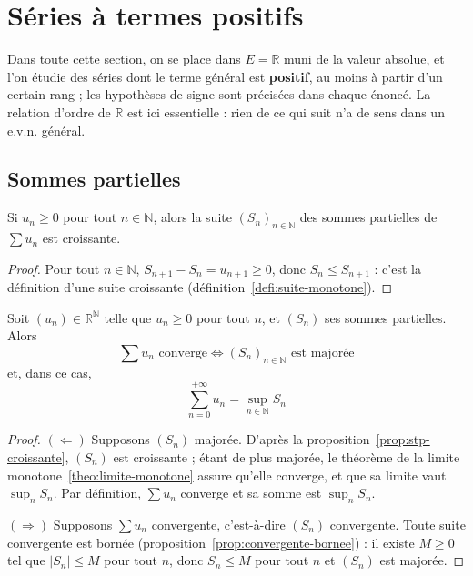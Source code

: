 \section{Séries à termes positifs}
\label{sec:stp}

Dans toute cette section, on se place dans $E=\mathbb{R}$ muni de la valeur absolue, et l'on étudie des séries dont le terme général est \textbf{positif}, au moins à partir d'un certain rang ; les hypothèses de signe sont précisées dans chaque énoncé. La relation d'ordre de $\mathbb{R}$ est ici essentielle : rien de ce qui suit n'a de sens dans un e.v.n. général.

\subsection{Sommes partielles}

\begin{prop}
\label{prop:stp-croissante}
Si $u_n\geq 0$ pour tout $n\in\mathbb{N}$, alors la suite $(S_n)_{n\in\mathbb{N}}$ des sommes partielles de $\sum u_n$ est croissante.
\end{prop}

\begin{proof}
Pour tout $n\in\mathbb{N}$, $S_{n+1}-S_n = u_{n+1} \geq 0$, donc $S_n\leq S_{n+1}$ : c'est la définition d'une suite croissante (définition~\ref{defi:suite-monotone}).
\end{proof}

\begin{theo}
\label{theo:stp-majoree}
Soit $(u_n)\in\mathbb{R}^{\mathbb{N}}$ telle que $u_n\geq 0$ pour tout $n$, et $(S_n)$ ses sommes partielles. Alors
\[\sum u_n \text{ converge} \iff (S_n)_{n\in\mathbb{N}} \text{ est majorée}\]
et, dans ce cas,
\[\sum_{n=0}^{+\infty}u_n = \sup_{n\in\mathbb{N}} S_n\]
\end{theo}

\begin{proof}
$(\Leftarrow)$ Supposons $(S_n)$ majorée. D'après la proposition~\ref{prop:stp-croissante}, $(S_n)$ est croissante ; étant de plus majorée, le théorème de la limite monotone~\ref{theo:limite-monotone} assure qu'elle converge, et que sa limite vaut $\sup_{n}S_n$. Par définition, $\sum u_n$ converge et sa somme est $\sup_n S_n$.

$(\Rightarrow)$ Supposons $\sum u_n$ convergente, c'est-à-dire $(S_n)$ convergente. Toute suite convergente est bornée (proposition~\ref{prop:convergente-bornee}) : il existe $M\geq 0$ tel que $|S_n|\leq M$ pour tout $n$, donc $S_n\leq M$ pour tout $n$ et $(S_n)$ est majorée.
\end{proof}

